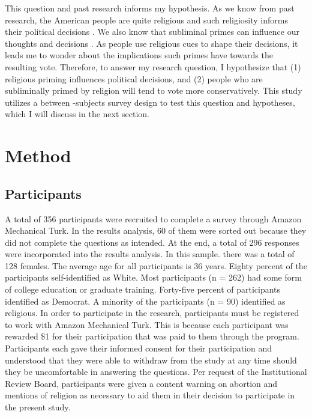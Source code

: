 \documentclass[letterpaper,man,natbib,noextraspace,12pt]{apa6}  %
\begin{document}
This question and past research informs my hypothesis. As we know from past research, the American people are quite religious \citep{putnam_american_2010} and such religiosity informs their political decisions \citep{rutchick_deus_2010}. We also know that subliminal primes can influence our thoughts \citep{kahneman_thinking_2012} and decisions \citep{albertson_religious_2011, kam_implicit_2007}. As people use religious cues to shape their decisions, it leads me to wonder about the implications such primes have towards the resulting vote. Therefore, to answer my research question, I hypothesize that (1) religious priming influences political decisions, and (2) people who are subliminally primed by religion will tend to vote more conservatively. This study utilizes a between -subjects survey design to test this question and hypotheses, which I will discuss in the next section. 

\section{Method}

\subsection{Participants}

A total of 356 participants were recruited to complete a survey through Amazon Mechanical Turk. In the results analysis, 60 of them were sorted out because they did not complete the questions as intended. At the end, a total of 296 responses were incorporated into the results analysis. In this sample. there was a total of 128 females. The average age for all participants is 36 years. Eighty percent of the participants self-identified as White. Most participants (n = 262) had some form of college education or graduate training. Forty-five percent of participants identified as Democrat. A minority of the participants (n = 90) identified as religious. In order to participate in the research, participants must be registered to work with Amazon Mechanical Turk. This is because each participant was rewarded \$1 for their participation that was paid to them through the program. Participants each gave their informed consent for their participation and understood that they were able to withdraw from the study at any time should they be uncomfortable in answering the questions. Per request of the Institutional Review Board, participants were given a content warning on abortion and mentions of religion as necessary to aid them in their decision to participate in the present study.
\end{document}
